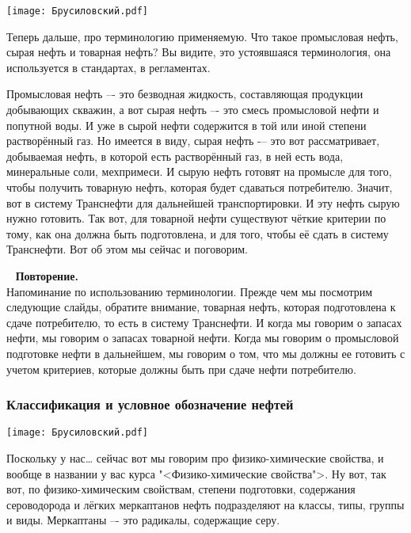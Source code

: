 \documentclass[main.tex]{subfiles}
\begin{document}
\begin{center}
\texttt{[image: Брусиловский.pdf]}
\end{center}

Теперь дальше, про терминологию применяемую.
Что такое промысловая нефть, сырая нефть и товарная нефть?
Вы видите, это устоявшаяся терминология, она используется в стандартах, в регламентах.

Промысловая нефть –- это безводная жидкость, составляющая продукции добывающих скважин, а вот сырая нефть –- это смесь промысловой нефти и попутной воды.
И уже в сырой нефти содержится в той или иной степени растворённый газ.
Но имеется в виду, сырая нефть -– это вот рассматривает, добываемая нефть, в которой есть растворённый газ, в ней есть вода, минеральные соли, мехпримеси.
И сырую нефть готовят на промысле для того, чтобы получить товарную нефть, которая будет сдаваться потребителю.
Значит, вот в систему Транснефти для дальнейшей транспортировки.
И эту нефть сырую нужно готовить.
Так вот, для товарной нефти существуют чёткие критерии по тому, как она должна быть подготовлена, и для того, чтобы её сдать в систему Транснефти.
Вот об этом мы сейчас и поговорим.

\ \newline
\textbf{Повторение.}\\
Напоминание по использованию терминологии.
Прежде чем мы посмотрим следующие слайды, обратите внимание, товарная нефть, которая подготовлена к сдаче потребителю, то есть в систему Транснефти.
И когда мы говорим о запасах нефти, мы говорим о запасах товарной нефти.
Когда мы говорим о промысловой подготовке нефти в дальнейшем, мы говорим о том, что мы должны ее готовить с учетом критериев, которые должны быть при сдаче нефти потребителю.

\subsubsection{Классификация и условное обозначение нефтей}

\begin{center}
\texttt{[image: Брусиловский.pdf]}
\end{center}

Поскольку у нас… сейчас вот мы говорим про физико-химические свойства,
и вообще в названии у вас курса "<Физико-химические свойства">.
Ну вот, так вот, по физико-химическим свойствам, степени подготовки, содержания сероводорода и лёгких меркаптанов нефть подразделяют на классы, типы, группы и виды.
Меркаптаны –- это радикалы, содержащие серу.
\end{document}
